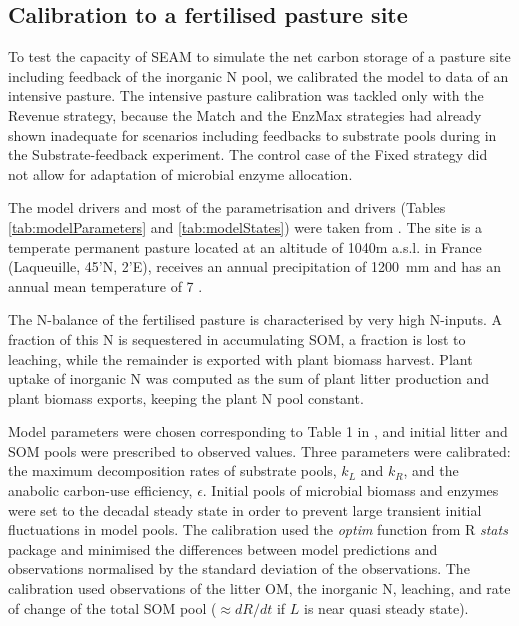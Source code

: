 \subsection{Calibration to a fertilised pasture site}
\label{sec:methodsPasture}

To test the capacity of SEAM to simulate the net carbon storage of a pasture
site including feedback of the inorganic N pool, we calibrated the model to data
of an intensive pasture. The intensive pasture calibration was tackled only with
the Revenue strategy, because the Match and the EnzMax strategies had already
shown inadequate for scenarios including feedbacks to substrate pools during
in the Substrate-feedback experiment. The control case of the Fixed
strategy did not allow for adaptation of microbial enzyme allocation. 

The model drivers and most of the parametrisation and drivers (Tables
\ref{tab:modelParameters} and \ref{tab:modelStates}) were taken from
\citet{Perveen14}.
The site is a temperate permanent pasture located at an altitude of 1040m
a.s.l. in France (Laqueuille, 45'N, 2'E), receives
an annual precipitation of 1200~mm and has an annual mean temperature of  7
. 

The N-balance of the fertilised pasture is characterised by very high 
N-inputs. A fraction of this N is sequestered in accumulating SOM, a fraction is
lost to leaching, while the remainder is exported with plant biomass harvest.
Plant uptake of inorganic N was computed as the sum of plant litter production
and plant biomass exports, keeping the plant N pool constant.
 
Model parameters were chosen corresponding to Table 1 in \citet{Perveen14}, and
initial litter and SOM pools were prescribed to observed values.
Three parameters were calibrated: the maximum decomposition rates
of substrate pools, $k_L$ and $k_R$, and the anabolic carbon-use efficiency,
$\epsilon$. Initial pools of microbial biomass and enzymes were set to the
decadal steady state in order to prevent large transient initial
fluctuations in model pools. The calibration used the \textit{optim} function
from R \textit{stats} package \citep{R07} and minimised the differences between model
predictions and observations normalised by the standard deviation of the
observations. The calibration used observations of the litter OM, the inorganic
N, leaching, and rate of change of the total SOM pool ($\approx dR/dt$ if $L$ is
near quasi steady state). 

